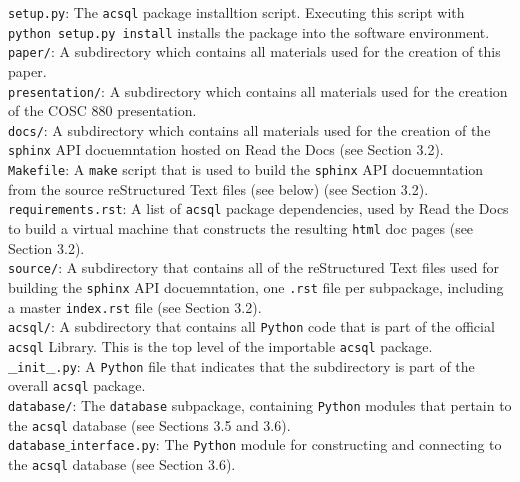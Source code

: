 \documentclass[10pt,journal,compsoc]{IEEEtran}
\begin{document}
\noindent\texttt{setup.py}: The \texttt{acsql} package installtion script.  Executing this script with \texttt{python setup.py install}
installs the package into the software environment.\\

\noindent\texttt{paper/}: A subdirectory which contains all materials used for the creation of this paper.\\

\noindent\texttt{presentation/}: A subdirectory which contains all materials used for the creation of the COSC 880 presentation.\\

\noindent\texttt{docs/}: A subdirectory which contains all materials used for the creation of the \texttt{sphinx} API docuemntation
hosted on Read the Docs (see Section 3.2).\\

\noindent\texttt{Makefile}: A \texttt{make} script that is used to build the \texttt{sphinx} API docuemntation from the source
reStructured Text files (see below) (see Section 3.2).\\

\noindent\texttt{requirements.rst}: A list of \texttt{acsql} package dependencies, used by Read the Docs to build a virtual
machine that constructs the resulting \texttt{html} doc pages (see Section 3.2).\\

\noindent\texttt{source/}: A subdirectory that contains all of the reStructured Text files used for building the \texttt{sphinx}
API docuemntation, one \texttt{.rst} file per subpackage, including a master \texttt{index.rst} file (see Section 3.2).\\

\noindent\texttt{acsql/}: A subdirectory that contains all \texttt{Python} code that is part of the official \texttt{acsql} Library.
This is the top level of the importable \texttt{acsql} package.\\

\noindent\texttt{$\_$$\_$init$\_$$\_$.py}: A \texttt{Python} file that indicates that the subdirectory is part of the overall
\texttt{acsql} package.\\

\noindent\texttt{database/}: The \texttt{database} subpackage, containing \texttt{Python} modules that pertain to the \texttt{acsql}
database (see Sections 3.5 and 3.6).\\

\noindent\texttt{database$\_$interface.py}: The \texttt{Python} module for constructing and connecting to the \texttt{acsql} database
(see Section 3.6). \\
\end{document}
